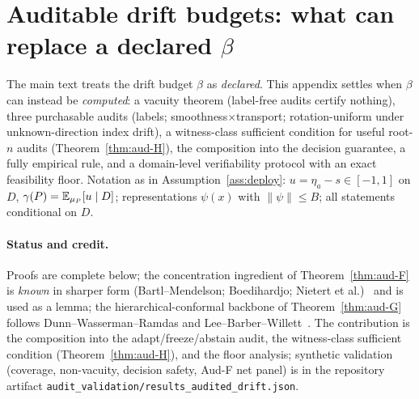 
\section{Auditable drift budgets: what can replace a declared $\beta$}\label{app:auditable}

The main text treats the drift budget $\beta$ as \emph{declared}. This appendix settles when
$\beta$ can instead be \emph{computed}: a vacuity theorem (label-free audits certify nothing), three
purchasable audits (labels; smoothness$\times$transport; rotation-uniform under unknown-direction
index drift), a witness-class sufficient condition for useful root-$n$ audits
(Theorem~\ref{thm:aud-H}), the composition into the decision guarantee, a fully empirical rule, and a
domain-level verifiability protocol with an exact feasibility floor. Notation as in
Assumption~\ref{ass:deploy}: $u=\eta_a-s\in[-1,1]$ on $D$, $\gamma(P)=\mathbb{E}_{\mu_P}[u\mid D]$;
representations $\psi(x)$ with $\|\psi\|\le B$; all statements conditional on $D$.

\paragraph{Status and credit.} Proofs are complete below; the concentration ingredient of
Theorem~\ref{thm:aud-F} is \emph{known} in sharper form (Bartl--Mendelson; Boedihardjo; Nietert
et al.)~\cite{bartl2022structure,bartl2023uniformdkw,boedihardjo2024sharp,nietert2022sliced} and
is used as a lemma; the hierarchical-conformal backbone of Theorem~\ref{thm:aud-G} follows
Dunn--Wasserman--Ramdas and Lee--Barber--Willett~\cite{dunn2022hierarchical,lee2023hierarchical}.
The contribution is the composition into the adapt/freeze/abstain audit, the witness-class
sufficient condition (Theorem~\ref{thm:aud-H}), and the floor analysis; synthetic validation
(coverage, non-vacuity, decision safety, Aud-F net panel) is in the repository artifact
\texttt{audit\_validation/results\_audited\_drift.json}.

